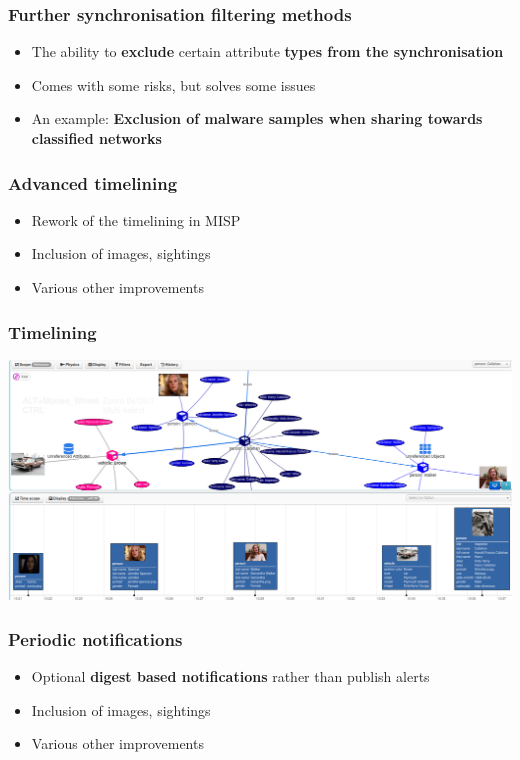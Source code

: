 \begin{frame}
  \frametitle{Further synchronisation filtering methods}
  \begin{itemize}
     \item The ability to {\bf exclude} certain attribute {\bf types from the synchronisation}
     \item Comes with some risks, but solves some issues
     \item An example: {\bf Exclusion of malware samples when sharing towards classified networks}
  \end{itemize}
\end{frame}

\begin{frame}
  \frametitle{Advanced timelining}
  \begin{itemize}
     \item Rework of the timelining in MISP
     \item Inclusion of images, sightings
     \item Various other improvements
  \end{itemize}
\end{frame}

\begin{frame}
\frametitle{Timelining}
\includegraphics[scale=0.2]{images/timelining.png}
\end{frame}

\begin{frame}
  \frametitle{Periodic notifications}
  \begin{itemize}
     \item Optional {\bf digest based notifications} rather than publish alerts
     \item Inclusion of images, sightings
     \item Various other improvements
  \end{itemize}
\end{frame}

